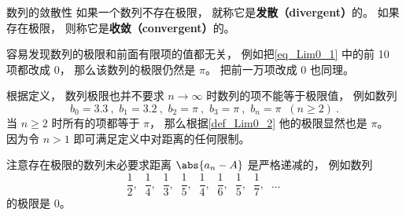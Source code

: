 \begin{definition}{数列的敛散性}\label{def_Lim0_4}
如果一个数列不存在极限， 就称它是\textbf{发散（divergent）}的。 如果存在极限， 则称它是\textbf{收敛（convergent）}的。
\end{definition}

\begin{example}{}
容易发现数列的极限和前面有限项的值都无关， 例如把\autoref{eq_Lim0_1} 中的前 10 项都改成 $0$， 那么该数列的极限仍然是 $\pi$。 把前一万项改成 $0$ 也同理。
\end{example}

\begin{example}{}
根据定义， 数列极限也并不要求 $n\to \infty$ 时数列的项不能等于极限值， 例如数列
\begin{equation}
b_0 = 3.3~,\,\, b_1 = 3.2~, \,\, b_2 = \pi~, \,\, b_3 = \pi~, \,\, b_n = \pi \;\; (n \ge 2)~.
\end{equation}
当 $n \ge 2$ 时所有的项都等于 $\pi$， 那么根据\autoref{def_Lim0_2} 他的极限显然也是 $\pi$。 因为令 $n > 1$ 即可满足定义中对距离的任何限制。
\end{example}

\begin{example}{}
注意存在极限的数列未必要求距离 $\abs{a_n - A}$ 是严格递减的， 例如数列
\begin{equation}
\frac{1}{2},\;\; \frac{1}{4},\;\; \frac{1}{3},\;\; \frac{1}{5},\;\; \frac{1}{4},\;\; \frac{1}{6},\;\; \frac{1}{5},\;\; \frac{1}{7},\;\; \dots~
\end{equation}
的极限是 $0$。
\end{example}
